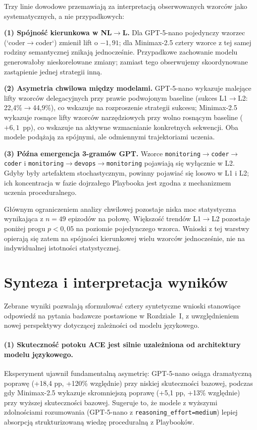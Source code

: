 Trzy linie dowodowe przemawiają za interpretacją obserwowanych wzorców jako systematycznych, a nie przypadkowych:

\textbf{(1) Spójność kierunkowa w NL$\to$L.} Dla GPT-5-nano pojedynczy wzorzec (`coder$\to$coder`) zmienił lift o $-1{,}91$; dla Minimax-2.5 cztery wzorce z tej samej rodziny semantycznej znikają jednocześnie. Przypadkowe zachowanie modelu generowałoby nieskorelowane zmiany; zamiast tego obserwujemy skoordynowane zastąpienie jednej strategii inną.

\textbf{(2) Asymetria chwilowa między modelami.} GPT-5-nano wykazuje malejące lifty wzorców delegacyjnych przy prawie podwojonym baseline (sukces L1$\to$L2: 22,4\%$\to$44,9\%), co wskazuje na rozproszenie strategii sukcesu; Minimax-2.5 wykazuje rosnące lifty wzorców narzędziowych przy wolno rosnącym baseline ($+6{,}1$~pp), co wskazuje na aktywne wzmacnianie konkretnych sekwencji. Oba modele podążają za spójnymi, ale odmiennymi trajektoriami uczenia.

\textbf{(3) Późna emergencja 3-gramów GPT.} Wzorce \texttt{monitoring$\to$coder$\to$coder} i \texttt{monitoring$\to$devops$\to$monitoring} pojawiają się wyłącznie w L2. Gdyby były artefaktem stochastycznym, powinny pojawiać się losowo w L1 i L2; ich koncentracja w fazie dojrzałego Playbooka jest zgodna z mechanizmem uczenia proceduralnego.

Głównym ograniczeniem analizy chwilowej pozostaje niska moc statystyczna wynikająca z $n = 49$ epizodów na połowę. Większość trendów L1$\to$L2 pozostaje poniżej progu $p < 0{,}05$ na poziomie pojedynczego wzorca. Wnioski z tej warstwy opierają się zatem na spójności kierunkowej wielu wzorców jednocześnie, nie na indywidualnej istotności statystycznej.

\section{Synteza i interpretacja wyników}

Zebrane wyniki pozwalają sformułować cztery syntetyczne wnioski stanowiące odpowiedź na pytania badawcze postawione w Rozdziale~I, z uwzględnieniem nowej perspektywy dotyczącej zależności od modelu językowego.

\paragraph{(1) Skuteczność potoku ACE jest silnie uzależniona od architektury modelu językowego.}
Eksperyment ujawnił fundamentalną asymetrię: GPT-5-nano osiąga dramatyczną poprawę (+18,4 pp, +120\% względnie) przy niskiej skuteczności bazowej, podczas gdy Minimax-2.5 wykazuje skromniejszą poprawę (+5,1 pp, +13\% względnie) przy wyższej skuteczności bazowej. Sugeruje to, że modele z wyższymi zdolnościami rozumowania (GPT-5-nano z \texttt{reasoning\_effort=medium}) lepiej absorpcją strukturizowaną wiedzę proceduralną z Playbooków.

